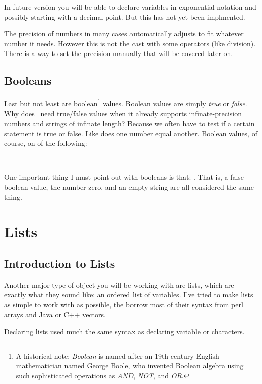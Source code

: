 \documentclass{book}
\begin{document}
In future version you will be able to declare variables in exponential notation and possibly starting with a decimal point.  But this has not yet been implmented.

The precision of numbers in many cases automatically adjusts to fit whatever number it needs.  However this is not the cast with some operators (like division).  There is a way to set the precision manually that will be covered later on.

\subsection{Booleans}

Last but not least are boolean\footnote{A historical note: \emph{Boolean} is named after an 19th century English mathematician named George Boole, who invented Boolean algebra using such sophisticated operations as \emph{AND}, \emph{NOT}, and \emph{OR}.} values.  Boolean values are simply \emph{true} or \emph{false}.  Why does \SSquared\ need true/false values when it already supports infinate-precision numbers and strings of infinate length?  Because we often have to test if a certain statement is true or false.  Like does one number equal another.  Boolean values, of course, on of the following:

\begin{SSCodeBox}
 \\
\end{SSCodeBox}

One important thing I must point out with booleans is that: .  That is, a false boolean value, the number zero, and an empty string are all considered the same thing.


\section{Lists}
\subsection{Introduction to Lists}
Another major type of object you will be working with are lists, which are exactly what they sound like: an ordered list of variables.  I've tried to make lists as simple to work with as possible, the borrow most of their syntax from perl arrays and Java or C++ vectors.


Declaring lists used much the same syntax as declaring variable or characters.
\end{document}
